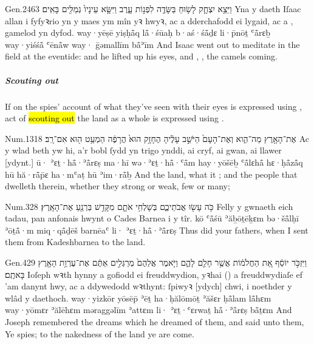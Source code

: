 \begin{example}{Gen.}{24}{63}{}{}
	\quoling
	{וַיֵּצֵ֥א יִצְחָ֛ק לָשׂ֥וּחַ בַּשָּׂדֶ֖ה לִפְנ֣וֹת עָ֑רֶב וַיִּשָּׂ֤א עֵינָיו֙   גְמַלִּ֖ים בָּאִֽים׃}
	{Yna y daeth Iſaac allan i fyfyꝛrio yn y maes ym mîn yꝛ hwyꝛ, ac a dderchafodd ei lygaid, ac a ,  gamelod yn dyfod.}
	{way·yēṣē yiṣḥå̄q lå̄·śūaḥ b·aś·śå̄ḏɛ li·p̄nōṯ ʿå̄rɛḇ way·yiśśå̄ ʿēnå̄w way·  ḡəmallīm bå̄ʾīm}
	{And Isaac went out to meditate in the field at the eventide: and he lifted up his eyes, and , , the camels  coming.}
\end{example}



\subparagraph{Scouting out}

\begin{paper}
	If on  the spies’ account of what they’ve seen with their eyes is expressed using , act of \hl{scouting out} the land as a whole is expressed using .
\end{paper}

\begin{example}{Num.}{13}{18}{}{}
	\quoling
	{ אֶת־הָאָ֖רֶץ מַה־הִ֑וא וְאֶת־הָעָם֙ הַיֹּשֵׁ֣ב עָלֶ֔יהָ הֶחָזָ֥ק הוּא֙ הֲרָפֶ֔ה הַמְעַ֥ט ה֖וּא אִם־רָֽב׃}
	{Ac  y wlad beth yw hi, a’r bobl ſydd yn trigo ynddi, ai cryf, ai gwan, ai llawer [ydynt.]}
	{ū· ʾɛṯ·hå̄·ʾå̄rɛṣ ma·hī wə·ʾɛṯ·hå̄·ʿå̄m hay·yōšēḇ ʿå̄lɛhå̄ hɛ·ḥå̄zå̄q hū hă·rå̄p̄ɛ ha·mʿaṭ hū ʾim·rå̄ḇ}
	{And  the land, what it ; and the people that dwelleth therein, whether they  strong or weak, few or many;}
\end{example}

\begin{example}{Num.}{32}{8}{}{}
	\quoling
	{כֹּ֥ה עָשׂ֖וּ אֲבֹתֵיכֶ֑ם בְּשָׁלְחִ֥י אֹתָ֛ם מִקָּדֵ֥שׁ בַּרְנֵ֖עַ  אֶת־הָאָֽרֶץ׃}
	{Felly y gwnaeth eich tadau, pan anfonais hwynt o Cades Barnea i  y tîr.}
	{kō ʿå̄śū ʾăḇōṯēḵɛm bə·šå̄lḥī ʾōṯå̄·m miq·qå̄ḏēš barnēaʿ li· ʾɛṯ·hå̄·ʾå̄rɛṣ}
	{Thus did your fathers, when I sent them from Kadeshbarnea to  the land.}
\end{example}

\begin{example}{Gen.}{42}{9}{}{}
	\quoling
	{וַיִּזְכֹּ֣ר יוֹסֵ֔ף אֵ֚ת הַחֲלֹמ֔וֹת אֲשֶׁ֥ר חָלַ֖ם לָהֶ֑ם וַיֹּ֤אמֶר אֲלֵהֶם֙ מְרַגְּלִ֣ים אַתֶּ֔ם  אֶת־עֶרְוַ֥ת הָאָ֖רֶץ בָּאתֶֽם׃}
	{Ioſeph wꝛth hynny a gofiodd ei freuddwydion, yꝛhai (\sic) a freuddwydiaſe ef ’am danynt hwy, ac a ddywedodd wꝛthynt: ſpiwyꝛ [ydych] chwi, i  noethder y wlâd y daethoch.}
	{way·yizkōr yōsēp̄ ʾēṯ ha·ḥălōmōṯ ʾăšɛr ḥå̄lam lå̄hɛm way·yōmɛr ʾălēhɛm məraggəlīm ʾattɛm li· ʾɛṯ·ʿɛrwaṯ hå̄·ʾå̄rɛṣ bå̄ṯɛm}
	{And Joseph remembered the dreams which he dreamed of them, and said unto them, Ye  spies; to  the nakedness of the land ye are come.}
\end{example}


